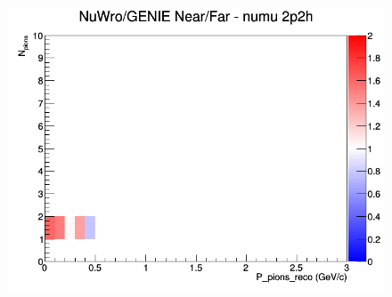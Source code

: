 \documentclass[12pt]{article}
\begin{document}
\begin{figure}[h]
\endminipage
{}
\includegraphics[width=\linewidth]{eff_N_P/FGT/pions/ratios/2p2h_NuWro_GENIE_numu_NF_N_P.png}
\endminipage
\newline
\end{figure}
\clearpage
\end{document}

